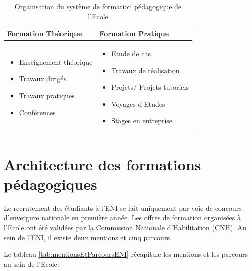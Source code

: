 \documentclass[12pt]{report}
\begin{document}
				\begin{table}[h]
				  \centering
				  \caption{Organisation du système de formation pédagogique de l’Ecole}
				  \label{tab:formationPedagogiqueENI}
					  \begin{tabular}{|p{7cm}|p{7cm}|}
					    \hline
					    \textbf{Formation Théorique} & \textbf{Formation Pratique} \\
					    \hline
					    \begin{itemize}
						\item Enseignement théorique
						\item Travaux dirigés
						\item Travaux pratiques
						\item Conférences
					    \end{itemize}
					 &  
					\begin{itemize}
						\item Etude de cas
						\item Travaux de réalisation
						\item Projets/ Projets tutoriels
						\item Voyages d’Etudes
						\item Stages en entreprise
					\end{itemize}
					\\
					    \hline
					  \end{tabular}
				\end{table}

				\section{Architecture des formations pédagogiques}

				\hspace{15pt} Le recrutement des étudiants à l’ENI se fait uniquement par voie de concours d’envergure nationale en première année. Les offres de formation organisées à l’Ecole ont été validées par la Commission Nationale d’Habilitation (CNH). Au sein de l’ENI, il existe deux mentions et cinq parcours.

				Le tableau \ref{tab:mentionsEtParcoursENI} récapitule les mentions et les parcours au sein de l’Ecole.
\end{document}
